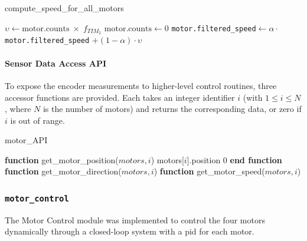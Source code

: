 \begin{algorithm}[H]
  \caption{compute\_speed\_for\_all\_motors}
  \begin{algorithmic}[1]
    \State \(\upsilon \gets \text{motor.counts} \;\times\; f_{TIM_2}\)
    \State $\text{motor.counts} \gets 0$
    \State \texttt{motor.filtered\_speed}$ \gets \alpha \cdot$ \texttt{motor.filtered\_speed} $+ (1 - \alpha) \cdot \upsilon$
    \EndFor
    \EndFunction
  \end{algorithmic}
\end{algorithm}

\paragraph*{Sensor Data Access API}

To expose the encoder measurements to higher-level control routines, three accessor functions are provided. Each takes an integer identifier \(i\) (with \(1\le i\le N\), where \(N\) is the number of motors) and returns the corresponding data, or zero if \(i\) is out of range.

\begin{algorithm}[H]
  \caption{motor\_API}
  \begin{algorithmic}[1]
    \State \textbf{function} get\_motor\_position($motors, i$)
    \State \Return motors[$i$].position
    \Else
    \State \Return $0$
    \EndIf
    \State \textbf{end function}
    \State \textbf{function} get\_motor\_direction($motors, i$)
    \State \textbf{function} get\_motor\_speed($motors, i$)
  \end{algorithmic}
\end{algorithm}
\subsubsection*{\texttt{motor\_control}}\label{sec:motor_control}

The Motor Control module was implemented to control the four motors dynamically through a closed-loop system with a \gls{pid} for each motor.

